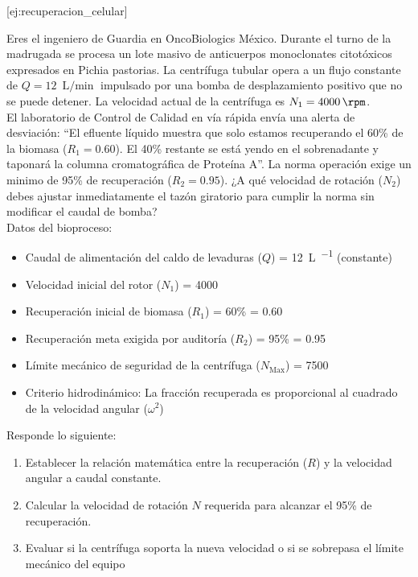 \documentclass{AsignaturaResumen}
\begin{document}
[ej:recuperacion_celular]{
    Eres el ingeniero de Guardia en OncoBiologics México. Durante el turno de la madrugada se procesa un lote masivo de anticuerpos monoclonates citotóxicos expresados en Pichia pastorias. La centrífuga tubular opera a un flujo constante de $Q = \qty{12}{\L\per\min}$ impulsado por una bomba de desplazamiento positivo que no se puede detener. La velocidad actual de la centrífuga es $N_{1} = \qty{4000}{\rpm}$. \\
    El laboratorio de Control de Calidad en vía rápida envía una alerta de desviación: ``El efluente líquido muestra que solo estamos recuperando el 60\% de la biomasa ($R_{1} = 0.60$). El 40\% restante se está yendo en el sobrenadante y taponará la columna cromatográfica de Proteína A''.  La norma operación exige un minimo de 95\% de recuperación ($R_{2} = 0.95$). ¿A qué velocidad de rotación ($N_{2}$) debes ajustar inmediatamente el tazón giratorio para cumplir la norma sin modificar el caudal de bomba? \\
    Datos del bioproceso:
    \begin{itemize}
        \item Caudal de alimentación del caldo de levaduras ($Q$) = \qty{12}{\L\per\min} (constante)
        \item Velocidad inicial del rotor ($N_{1}$) = \qty{4000}{\rpm}
        \item Recuperación inicial de biomasa ($R_{1}$) = 60\% = 0.60
        \item Recuperación meta exigida por auditoría ($R_{2}$) = 95\% = 0.95
        \item Límite mecánico de seguridad de la centrífuga ($N_{\text{Max}}$) = \qty{7500}{\rpm}
        \item Criterio hidrodinámico: La fracción recuperada es proporcional al cuadrado de la velocidad angular ($\omega^{2}$)
    \end{itemize}
    Responde lo siguiente:
    \begin{enumerate}
        \item Establecer la relación matemática entre la recuperación ($R$) y la velocidad angular a caudal constante.
        \item Calcular la velocidad de rotación $N$ requerida para alcanzar el 95\% de recuperación.
        \item Evaluar si la centrífuga soporta la nueva velocidad o si se sobrepasa el límite mecánico del equipo
    \end{enumerate}
}
\end{document}
